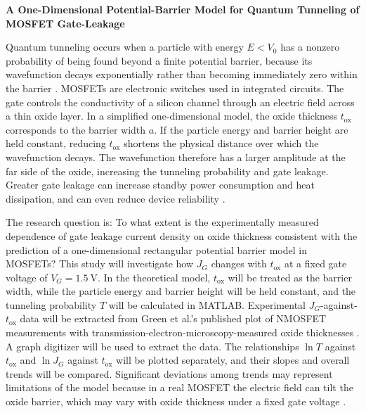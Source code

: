 \documentclass[12pt]{article}
\begin{document}
\begin{center}
    {\large\bfseries A One-Dimensional Potential-Barrier Model for Quantum Tunneling of MOSFET Gate-Leakage}
\end{center}

Quantum tunneling occurs when a particle with energy \(E<V_0\) has a nonzero probability of being found beyond a finite potential barrier, because its wavefunction decays exponentially rather than becoming immediately zero within the barrier \cite{townsend2010}. MOSFETs are electronic switches used in integrated circuits. The gate controls the conductivity of a silicon channel through an electric field across a thin oxide layer. In a simplified one-dimensional model, the oxide thickness \(t_{\mathrm{ox}}\) corresponds to the barrier width \(a\). If the particle energy and barrier height are held constant, reducing \(t_{\mathrm{ox}}\) shortens the physical distance over which the wavefunction decays. The wavefunction therefore has a larger amplitude at the far side of the oxide, increasing the tunneling probability and gate leakage. Greater gate leakage can increase standby power consumption and heat dissipation, and can even reduce device reliability \cite{green2001review}.

The research question is: To what extent is the experimentally measured dependence of gate leakage current density on oxide thickness consistent with the prediction of a one-dimensional rectangular potential barrier model in MOSFETs? This study will investigate how \(J_G\) changes with \(t_{\mathrm{ox}}\) at a fixed gate voltage of \(V_G=1.5~\mathrm{V}\). In the theoretical model, \(t_{\mathrm{ox}}\) will be treated as the barrier width, while the particle energy and barrier height will be held constant, and the tunneling probability \(T\) will be calculated in MATLAB. Experimental \(J_G\)-against-\(t_{\mathrm{ox}}\) data will be extracted from Green et al.'s published plot of NMOSFET measurements with transmission-electron-microscopy-measured oxide thicknesses \cite{green1999limits,green2001review}. A graph digitizer will be used to extract the data. The relationships \(\ln T\) against \(t_{\mathrm{ox}}\) and \(\ln J_G\) against \(t_{\mathrm{ox}}\) will be plotted separately, and their slopes and overall trends will be compared. Significant deviations among trends may represent limitations of the model because in a real MOSFET the electric field can tilt the oxide barrier, which may vary with oxide thickness under a fixed gate voltage \cite{green2001review}.
\end{document}
